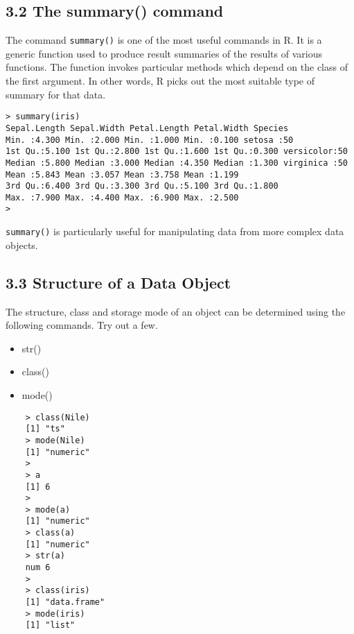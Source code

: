 \documentclass[a4paper,12pt]{article}
\begin{document}
\subsection*{3.2 The summary() command}
The command \texttt{summary()} is one of the most useful commands in R. It is a generic function used
to produce result summaries of the results of various functions. The function invokes particular
methods which depend on the class of the first argument. In other words, R picks out the most
suitable type of summary for that data.
\begin{framed}
\begin{verbatim}
> summary(iris)
Sepal.Length Sepal.Width Petal.Length Petal.Width Species
Min. :4.300 Min. :2.000 Min. :1.000 Min. :0.100 setosa :50
1st Qu.:5.100 1st Qu.:2.800 1st Qu.:1.600 1st Qu.:0.300 versicolor:50
Median :5.800 Median :3.000 Median :4.350 Median :1.300 virginica :50
Mean :5.843 Mean :3.057 Mean :3.758 Mean :1.199
3rd Qu.:6.400 3rd Qu.:3.300 3rd Qu.:5.100 3rd Qu.:1.800
Max. :7.900 Max. :4.400 Max. :6.900 Max. :2.500
>

\end{verbatim}
\end{framed}
\texttt{summary()} is particularly useful for manipulating data from more complex data objects.

\subsection{3.3 Structure of a Data Object}
The structure, class and storage mode of an object can be determined using the following
commands. Try out a few.
\begin{itemize}
	\item str()
	\item class()
	\item mode()
\end{itemize}
\begin{framed}
	\begin{verbatim}
	> class(Nile)
	[1] "ts"
	> mode(Nile)
	[1] "numeric"
	>
	> a
	[1] 6
	>
	> mode(a)
	[1] "numeric"
	> class(a)
	[1] "numeric"
	> str(a)
	num 6
	>
	> class(iris)
	[1] "data.frame"
	> mode(iris)
	[1] "list"
	\end{verbatim}
\end{framed}
\end{document}
